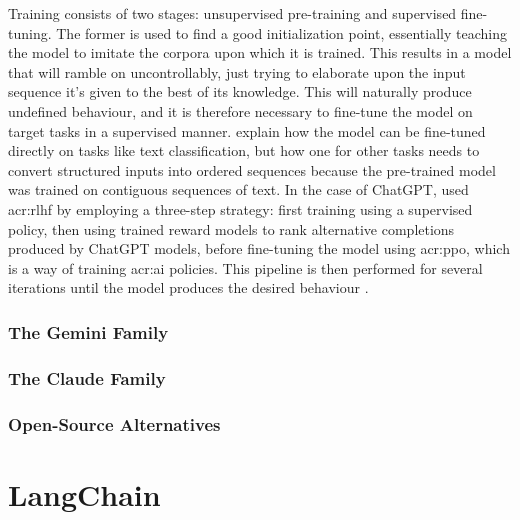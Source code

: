 Training consists of two stages: unsupervised pre-training and supervised fine-tuning. The former is used to find a good initialization point, essentially teaching the model to imitate the corpora upon which it is trained. This results in a model that will ramble on uncontrollably, just trying to elaborate upon the input sequence it's given to the best of its knowledge. This will naturally produce undefined behaviour, and it is therefore necessary to fine-tune the model on target tasks in a supervised manner. \cite[4]{radfordImprovingLanguageUnderstanding2018} explain how the model can be fine-tuned directly on tasks like text classification, but how one for other tasks needs to convert structured inputs into ordered sequences because the pre-trained model was trained on contiguous sequences of text. In the case of ChatGPT, \citeauthor{openaiIntroducingChatGPT2022} used \gls{acr:rlhf} by employing a three-step strategy: first training using a supervised policy, then using trained reward models to rank alternative completions produced by ChatGPT models, before fine-tuning the model using \gls{acr:ppo}, which is a way of training \acrshort{acr:ai} policies. This pipeline is then performed for several iterations until the model produces the desired behaviour \citep{openaiIntroducingChatGPT2022}.

\subsubsection{The Gemini Family}
\label{subsubsec:gemini}

\subsubsection{The Claude Family}
\label{subsubsec:claude}

\subsubsection{Open-Source Alternatives}
\label{subsubsec:open-source-llms}


\section{LangChain}
\label{sec:langchain}

